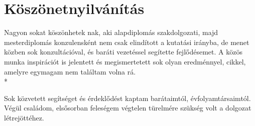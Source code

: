 \chapter*{Köszönetnyilvánítás}

Nagyon sokat köszönhetek \vikkonzulens nak, aki alapdiplomás szakdolgozati, majd mesterdiplomás konzulensként nem csak elindított a kutatási irányba, de menet közben sok konzultációval, és baráti vezetéssel segítette fejlődésemet. A közös munka inspirációt is jelentett és megismertetett sok olyan eredménnyel, cikkel, amelyre egymagam nem találtam volna rá.\\*

Sok közvetett segítséget és érdeklődést kaptam barátaimtól, évfolyamtársaimtól. Végül családom, elsősorban feleségem végtelen türelmére szükség volt a dolgozat létrejöttéhez.
